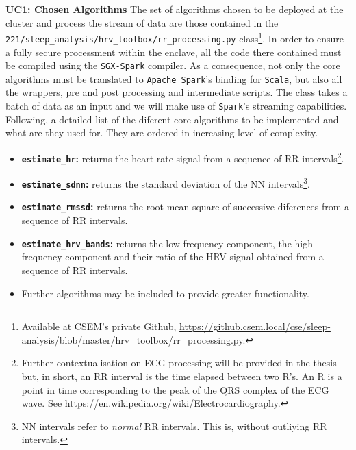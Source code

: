 \documentclass{article}
\begin{document}
\textbf{UC1: Chosen Algorithms}
The set of algorithms chosen to be deployed at the cluster and process the stream of data are those contained in the \texttt{221/sleep\_analysis/hrv\_toolbox/rr\_processing.py} class\footnote{Available at CSEM's private Github, \url{https://github.csem.local/cse/sleep-analysis/blob/master/hrv_toolbox/rr_processing.py}.}. In order to ensure a fully secure processment within the enclave, all the code there contained must be compiled using the \texttt{SGX-Spark} compiler. As a consequence, not only the core algorithms must be translated to \texttt{Apache Spark}'s binding for \texttt{Scala}, but also all the wrappers, pre and post processing and intermediate scripts. The class takes a batch of data as an input and we will make use of \texttt{Spark}'s streaming capabilities. Following, a detailed list of the diferent core algorithms to be implemented and what are they used for. They are ordered in increasing level of complexity.
\begin{itemize}
    \item \textbf{\texttt{estimate\_hr}:} returns the heart rate signal from a sequence of RR intervals\footnote{Further contextualisation on ECG processing will be provided in the thesis but, in short, an RR interval is the time elapsed between two R's. An R is a point in time corresponding to the peak of the QRS complex of the ECG wave. See \url{https://en.wikipedia.org/wiki/Electrocardiography}.}.
    \item \textbf{\texttt{estimate\_sdnn}:} returns the standard deviation of the NN intervals\footnote{NN intervals refer to \emph{normal} RR intervals. This is, without outliying RR intervals.}.
    \item \textbf{\texttt{estimate\_rmssd}:} returns the root mean square of successive diferences from a sequence of RR intervals.
    \item \textbf{\texttt{estimate\_hrv\_bands}:} returns the low frequency component, the high frequency component and their ratio of the HRV signal obtained from a sequence of RR intervals.
    \item Further algorithms may be included to provide greater functionality.
\end{itemize}
\end{document}
